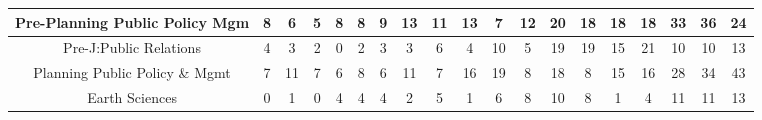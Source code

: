 \documentclass[10pt]{article}
\begin{document}
\begin{landscape}
\begin{longtable}[c]{|ccccccccccccccccccc|}
	\multicolumn{1}{|c|}{Pre-Planning Public Policy Mgm}             & \multicolumn{1}{c|}{8}          & \multicolumn{1}{c|}{6}          & \multicolumn{1}{c|}{5}          & \multicolumn{1}{c|}{8}          & \multicolumn{1}{c|}{8}          & \multicolumn{1}{c|}{9}          & \multicolumn{1}{c|}{13}         & \multicolumn{1}{c|}{11}         & \multicolumn{1}{c|}{13}         & \multicolumn{1}{c|}{7}          & \multicolumn{1}{c|}{12}         & \multicolumn{1}{c|}{20}         & \multicolumn{1}{c|}{18}         & \multicolumn{1}{c|}{18}         & \multicolumn{1}{c|}{18}         & \multicolumn{1}{c|}{33}         & \multicolumn{1}{c|}{36}         & 24         \\ \hline
	\multicolumn{1}{|c|}{Pre-J:Public Relations}                     & \multicolumn{1}{c|}{4}          & \multicolumn{1}{c|}{3}          & \multicolumn{1}{c|}{2}          & \multicolumn{1}{c|}{0}          & \multicolumn{1}{c|}{2}          & \multicolumn{1}{c|}{3}          & \multicolumn{1}{c|}{3}          & \multicolumn{1}{c|}{6}          & \multicolumn{1}{c|}{4}          & \multicolumn{1}{c|}{10}         & \multicolumn{1}{c|}{5}          & \multicolumn{1}{c|}{19}         & \multicolumn{1}{c|}{19}         & \multicolumn{1}{c|}{15}         & \multicolumn{1}{c|}{21}         & \multicolumn{1}{c|}{10}         & \multicolumn{1}{c|}{10}         & 13         \\ \hline
	\multicolumn{1}{|c|}{Planning Public Policy \& Mgmt}             & \multicolumn{1}{c|}{7}          & \multicolumn{1}{c|}{11}         & \multicolumn{1}{c|}{7}          & \multicolumn{1}{c|}{6}          & \multicolumn{1}{c|}{8}          & \multicolumn{1}{c|}{6}          & \multicolumn{1}{c|}{11}         & \multicolumn{1}{c|}{7}          & \multicolumn{1}{c|}{16}         & \multicolumn{1}{c|}{19}         & \multicolumn{1}{c|}{8}          & \multicolumn{1}{c|}{18}         & \multicolumn{1}{c|}{8}          & \multicolumn{1}{c|}{15}         & \multicolumn{1}{c|}{16}         & \multicolumn{1}{c|}{28}         & \multicolumn{1}{c|}{34}         & 43         \\ \hline
	\multicolumn{1}{|c|}{Earth Sciences}                             & \multicolumn{1}{c|}{0}          & \multicolumn{1}{c|}{1}          & \multicolumn{1}{c|}{0}          & \multicolumn{1}{c|}{4}          & \multicolumn{1}{c|}{4}          & \multicolumn{1}{c|}{4}          & \multicolumn{1}{c|}{2}          & \multicolumn{1}{c|}{5}          & \multicolumn{1}{c|}{1}          & \multicolumn{1}{c|}{6}          & \multicolumn{1}{c|}{8}          & \multicolumn{1}{c|}{10}         & \multicolumn{1}{c|}{8}          & \multicolumn{1}{c|}{1}          & \multicolumn{1}{c|}{4}          & \multicolumn{1}{c|}{11}         & \multicolumn{1}{c|}{11}         & 13         \\ \hline

\end{longtable}
\end{landscape}
\end{document}
